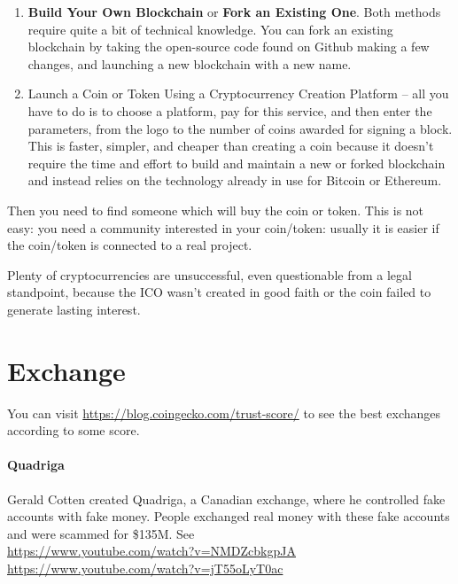 \begin{enumerate}
    \item \textbf{Build Your Own Blockchain} or \textbf{Fork an Existing One}. Both methods require quite a bit of technical knowledge. You can fork an existing blockchain by taking the open-source code found on Github making a few changes, and launching a new blockchain with a new name.
    \item Launch a Coin or Token Using a Cryptocurrency Creation Platform -- all you have to do is to choose a platform, pay for this service, and then enter the parameters, from the logo to the number of coins awarded for signing a block.
    This is faster, simpler, and cheaper than creating a coin because it doesn't require the time and effort to build and maintain a new or forked blockchain and instead relies on the technology already in use for Bitcoin or Ethereum.
\end{enumerate}

Then you need to find someone which will buy the coin or token. This is not easy: you need a community interested in your coin/token: usually it is easier if the coin/token is connected to a real project.

Plenty of cryptocurrencies are unsuccessful, even questionable from a legal standpoint, because the ICO wasn't created in good faith or the coin failed to generate lasting interest.

\section{Exchange}

You can visit \url{https://blog.coingecko.com/trust-score/} to see the best exchanges according to some score.

\paragraph{Quadriga} Gerald Cotten created Quadriga, a Canadian exchange, where he controlled fake accounts with fake money. People exchanged real money with these fake accounts and were scammed for \$135M. See\\
\url{https://www.youtube.com/watch?v=NMDZcbkgpJA}\\
\url{https://www.youtube.com/watch?v=jT55oLyT0ac}


